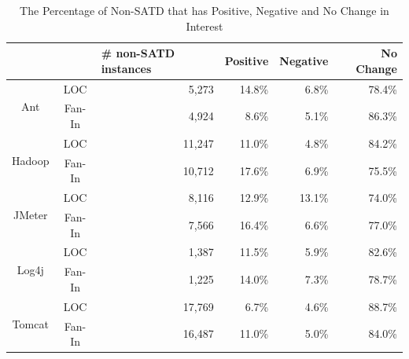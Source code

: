 \documentclass[10pt, conference]{IEEEtran}
\begin{document}
\begin{table}[tb]
  \caption{The Percentage of Non-SATD that has Positive, Negative and No Change in Interest}
  \label{tab:percentage_non-SATD} 
  \centering

  \begin{tabular}{cc|p{0.65in}|rrr}
  \hline
        & & \textbf{\# non-SATD instances} & \textbf{Positive} & \textbf{Negative} & \textbf{No Change} \\
  \hline
\multirow{2}{*}{Ant} &  LOC  & \multicolumn{1}{r|}{5,273} &  14.8\%  &  6.8\% & 78.4\%\\
                   & Fan-In  & \multicolumn{1}{r|}{4,924} &  8.6\%  &  5.1\% & 86.3\%\\
  \hline
\multirow{2}{*}{Hadoop} &  LOC  & \multicolumn{1}{r|}{11,247} &  11.0\%  &  4.8\% & 84.2\%\\
                      & Fan-In  & \multicolumn{1}{r|}{10,712} &  17.6\%  &  6.9\% & 75.5\%\\
  \hline
\multirow{2}{*}{JMeter} &  LOC  & \multicolumn{1}{r|}{8,116} &  12.9\%  &  13.1\% & 74.0\%\\
                      & Fan-In  & \multicolumn{1}{r|}{7,566} &  16.4\%  &  6.6\% & 77.0\%\\
  \hline
\multirow{2}{*}{Log4j} &  LOC  & \multicolumn{1}{r|}{1,387} &  11.5\%  &  5.9\% & 82.6\%\\
                     & Fan-In  & \multicolumn{1}{r|}{1,225} &  14.0\%  &  7.3\% & 78.7\%\\
  \hline
\multirow{2}{*}{Tomcat} &  LOC  & \multicolumn{1}{r|}{17,769} &  6.7\%  &  4.6\% & 88.7\%\\
                      & Fan-In  & \multicolumn{1}{r|}{16,487} &  11.0\%  &  5.0\% & 84.0\%\\
  \hline
  \end{tabular}
\end{table}
\end{document}
